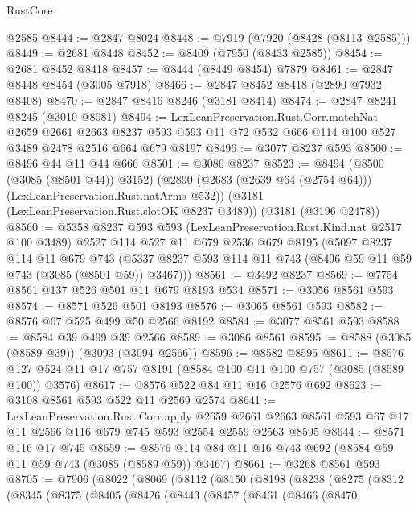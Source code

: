 \begin{lexlean}{RustCore}
\begin{coremodule}
    @2585
@8444 := @2847 @8024
@8448 := @7919 (@7920 (@8428 (@8113 @2585)))
@8449 := @2681 @8448
@8452 := @8409 (@7950 (@8433 @2585))
@8454 := @2681 @8452 @8418
@8457 := @8444 (@8449 @8454) @7879
@8461 := @2847 @8448 @8454 (@3005 @7918)
@8466 := @2847 @8452 @8418 (@2890 @7932 @8408)
@8470 := @2847 @8416 @8246 (@3181 @8414)
@8474 := @2847 @8241 @8245 (@3010 @8081)
@8494 := LexLeanPreservation.Rust.Corr.matchNat
    @2659
    @2661
    @2663
    @8237
    @593
    @593
    @11
    @72
    @532
    @666
    @114
    @100
    @527
    @3489
    @2478
    @2516
    @664
    @679
    @8197
@8496 := @3077 @8237 @593
@8500 := @8496 @44 @11 @44 @666
@8501 := @3086 @8237
@8523 := @8494
    (@8500 (@3085 (@8501 @44)) @3152)
    (@2890 (@2683 (@2639 @64 (@2754 @64))) (LexLeanPreservation.Rust.natArms @532))
    (@3181 (LexLeanPreservation.Rust.slotOK @8237 @3489))
    (@3181 (@3196 @2478))
@8560 := @5358
    @8237
    @593
    @593
    (LexLeanPreservation.Rust.Kind.nat @2517 @100 @3489)
    @2527
    @114
    @527
    @11
    @679
    @2536
    @679
    @8195
    (@5097
      @8237
      @114
      @11
      @679
      @743
      (@5337 @8237 @593 @114 @11 @743 (@8496 @59 @11 @59 @743 (@3085 (@8501 @59)) @3467)))
@8561 := @3492 @8237
@8569 := @7754 @8561 @137 @526 @501 @11 @679 @8193 @534
@8571 := @3056 @8561 @593
@8574 := @8571 @526 @501 @8193
@8576 := @3065 @8561 @593
@8582 := @8576 @67 @525 @499 @50 @2566 @8192
@8584 := @3077 @8561 @593
@8588 := @8584 @39 @499 @39 @2566
@8589 := @3086 @8561
@8595 := @8588 (@3085 (@8589 @39)) (@3093 (@3094 @2566))
@8596 := @8582 @8595
@8611 := @8576 @127 @524 @11 @17 @757 @8191 (@8584 @100 @11 @100 @757 (@3085 (@8589 @100)) @3576)
@8617 := @8576 @522 @84 @11 @16 @2576 @692
@8623 := @3108 @8561 @593 @522 @11 @2569 @2574
@8641 := LexLeanPreservation.Rust.Corr.apply
    @2659
    @2661
    @2663
    @8561
    @593
    @67
    @17
    @11
    @2566
    @116
    @679
    @745
    @593
    @2554
    @2559
    @2563
    @8595
@8644 := @8571 @116 @17 @745
@8659 := @8576 @114 @84 @11 @16 @743 @692 (@8584 @59 @11 @59 @743 (@3085 (@8589 @59)) @3467)
@8661 := @3268 @8561 @593
@8705 := @7906
    (@8022
      (@8069
        (@8112
          (@8150
            (@8198
              (@8238
                (@8275
                  (@8312
                    (@8345
                      (@8375
                        (@8405
                          (@8426
                            (@8443
                              (@8457
                                (@8461
                                  (@8466
                                    (@8470

\end{coremodule}
\end{lexlean}
